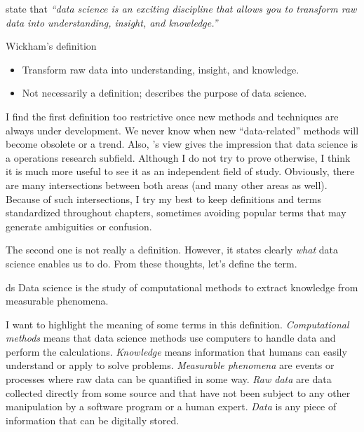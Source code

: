 \textcite{Wickham2023} state that \emph{``data science is an exciting discipline that
allows you to transform raw data into understanding, insight, and knowledge.''}

\begin{slidebox}{Wickham's definition}{}
  \begin{itemize}
    \item Transform raw data into understanding, insight, and knowledge.
    \item Not necessarily a definition; describes the purpose of data science.
  \end{itemize}
\end{slidebox}

I find the first definition too restrictive once new methods and techniques are always
under development.  We never know when new ``data-related'' methods will become obsolete
or a trend.  Also, \citeauthor{Zumel2019}'s view gives the impression that data science is a
operations research subfield.  Although I do not try to prove otherwise, I think it
is much more useful to see it as an independent field of study.  Obviously, there are
many intersections between both areas (and many other areas as well).  Because of such
intersections, I try my best to keep definitions and
terms standardized throughout chapters, sometimes avoiding popular terms that may generate
ambiguities or confusion.

The second one is not really a definition.  However, it states clearly \emph{what} data
science enables us to do.  From these thoughts, let's define the term.

\begin{defbox}{}{ds}
  Data science is the study of computational methods to extract knowledge from
  measurable phenomena.
\end{defbox}

I want to highlight the meaning of some terms in this definition.  \emph{Computational methods} means
that data science methods use computers to handle data and perform the calculations.
\emph{Knowledge} means information that humans can easily understand or apply to solve
problems.  \emph{Measurable phenomena} are events or processes where raw data can be
quantified in some way.  \emph{Raw data} are data collected directly from some source and
that have not been subject to any other manipulation by a software program or a human
expert.  \emph{Data} is any piece of information that can be digitally stored.

